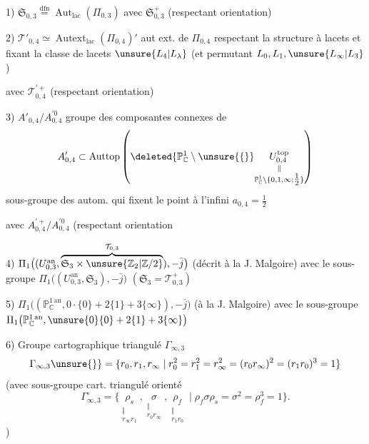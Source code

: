 1) $\mathfrak S_{0,3}\overset{\text{dfn}}{=}\operatorname{Aut}_{\mathrm{lac}}(\Pi_{0,3})$
avec  $\mathfrak S_{0,3}^{+}$ (respectant orientation)

2) $\mathcal{T}'_{0,4}\simeq\operatorname{Autext}_{\mathrm{lac}}(\Pi_{0,4})'$
aut ext. de $\Pi_{0,4}$ respectant la structure à lacets et fixant la classe de lacets
$\unsure{L_4|L_\lambda}$ (et permutant $L_0,L_1,\unsure{L_\infty|L_3}$)

avec $\mathcal{T}_{0,4}^{\prime+}$ (respectant orientation)

3) $A'_{0,4}/A_{0,4}^{\prime0}$ groupe des composantes connexes de
\[
A'_{0,4}\subset\operatorname{Auttop}
\left(\deleted{\mathbb P^1_{\mathbb C}\setminus\unsure{\{}}
\underset{\substack{\Vert\\\mathbb P^1_{\mathbb C}\setminus\{0,1,\infty;\tfrac12\}}}{U_{0,4}^{\mathrm{top}}}\right)
\]
sous-groupe des autom. qui fixent le point à l'infini $a_{0,4}=\tfrac12$

avec $A_{0,4}^{\prime+}/A_{0,4}^{\prime0}$ (respectant orientation

4) $\Pi_1\bigl((U_{0,3}^{\mathrm{an}},\overbrace{\mathfrak S_3\times\unsure{\mathbb Z_2|\mathbb Z/2}}^{\mathcal{T}_{0,3}}),-\bar j\bigr)$
(décrit à la J. Malgoire)
avec le sous-groupe $\Pi_1\bigl((U_{0,3}^{\mathrm{an}},\mathfrak S_3),-\bar j\bigr)$
$(\mathfrak S_3=\mathcal{T}_{0,3}^{+})$

5) $\Pi_1\bigl((\mathbb P^{1\,\mathrm{an}}_{\mathbb C},0\cdot\{0\}+2\{1\}+3\{\infty\}),-\bar j\bigr)$
(à la J. Malgoire)
avec le sous-groupe $\Pi_1\bigl(\mathbb P^{1\,\mathrm{an}}_{\mathbb C},\unsure{0}\{0\}+2\{1\}+3\{\infty\}\bigr)$

6) Groupe cartographique triangulé  $\Gamma_{\infty,3}$
\[
\Gamma_{\infty,3}\unsure{\}}=\{r_0,r_1,r_\infty\mid
r_0^2=r_1^2=r_\infty^2=(r_0r_\infty)^2=(r_1r_0)^3=1\}
\]
(avec sous-groupe cart. triangulé orienté
\[
\Gamma_{\infty,3}^{\circ}=\{
\underset{\substack{\Vert\\r_\infty r_1}}{\rho_s},
\underset{\substack{\Vert\\r_0r_\infty}}{\sigma},
\underset{\substack{\Vert\\r_1r_0}}{\rho_f}
\mid\rho_f\sigma\rho_s=\sigma^2=\rho_f^3=1\}.
\]
)


